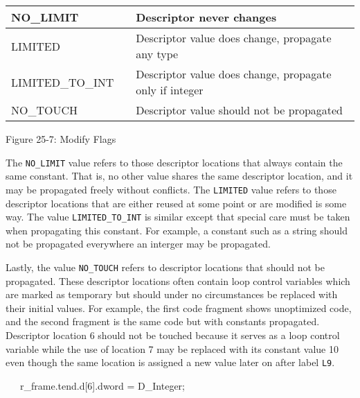 \begin{center}
\tabletail{}
\tablelasttail{}
\begin{supertabular}{|m{1.4302598in}|m{0.41155985in}|m{3.7115598in}|}
\hline
{\ttfamily NO\_LIMIT} &
 &
 Descriptor never changes\\\hline
{\ttfamily LIMITED} &
 &
 Descriptor value does change, propagate any type\\\hline
{\ttfamily LIMITED\_TO\_INT} &
 &
 Descriptor value does change, propagate only if integer\\\hline
{\ttfamily NO\_TOUCH} &
 &
 Descriptor value should not be propagated\\\hline
\end{supertabular}
\end{center}
{\centering{}
Figure 25-7: Modify Flags
\par}


The \texttt{NO\_LIMIT} value refers to those descriptor locations that
always contain the same constant. That is, no other value shares the
same descriptor location, and it may be propagated freely without
conflicts. The \texttt{LIMITED} value refers to those descriptor
locations that are either reused at some point or are modified is some
way. The value \texttt{LIMITED\_TO\_INT} is similar except that
special care must be taken when propagating this constant. For
example, a constant such as a string should not be propagated
everywhere an interger may be propagated.

Lastly, the value \texttt{NO\_TOUCH} refers to descriptor locations
that should not be propagated. These descriptor locations often
contain loop control variables which are marked as temporary but
should under no circumstances be replaced with their initial
values. For example, the first code fragment shows unoptimized code,
and the second fragment is the same code but with constants
propagated. Descriptor location 6 should not be touched because it
serves as a loop control variable while the use of location 7 may be
replaced with its constant value 10 even though the same location is
assigned a new value later on after label \texttt{L9}.

{\ttfamily\mdseries
\ \ \ r\_frame.tend.d[6].dword = D\_Integer;}

